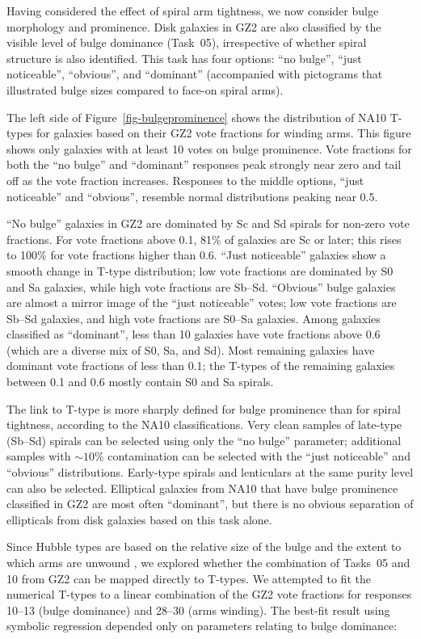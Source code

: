 \documentclass[useAMS,usenatbib]{mn2e}
\begin{document}
Having considered the effect of spiral arm tightness, we now consider bulge morphology and prominence. Disk galaxies in GZ2 are also classified by the visible level of bulge dominance (Task~05), irrespective of whether spiral structure is also identified. This task has four options: ``no bulge'', ``just noticeable'', ``obvious'', and ``dominant'' (accompanied with pictograms that illustrated bulge sizes compared to face-on spiral arms). 

The left side of Figure~\ref{fig-bulgeprominence} shows the distribution of NA10 T-types for galaxies based on their GZ2 vote fractions for winding arms. This figure shows only galaxies with at least 10 votes on bulge prominence. Vote fractions for both the ``no bulge'' and ``dominant'' responses peak strongly near zero and tail off as the vote fraction increases. Responses to the middle options, ``just noticeable'' and ``obvious'', resemble normal distributions peaking near 0.5. 

``No bulge'' galaxies in GZ2 are dominated by Sc and Sd spirals for non-zero vote fractions. For vote fractions above 0.1, 81\% of galaxies are Sc or later; this rises to 100\% for vote fractions higher than 0.6. ``Just noticeable'' galaxies show a smooth change in T-type distribution; low vote fractions are dominated by S0 and Sa galaxies, while high vote fractions are Sb--Sd. ``Obvious'' bulge galaxies are almost a mirror image of the ``just noticeable'' votes; low vote fractions are Sb--Sd galaxies, and high vote fractions are S0--Sa galaxies. Among galaxies classified as ``dominant'', less than 10 galaxies have vote fractions above 0.6 (which are a diverse mix of S0, Sa, and Sd). Most remaining galaxies have dominant vote fractions of less than 0.1; the T-types of the remaining galaxies between 0.1 and 0.6 mostly contain S0 and Sa spirals. 

The link to T-type is more sharply defined for bulge prominence than for spiral tightness, according to the NA10 classifications. Very clean samples of late-type (Sb--Sd) spirals can be selected using only the ``no bulge'' parameter; additional samples with $\sim10$\% contamination can be selected with the ``just noticeable'' and ``obvious'' distributions. Early-type spirals and lenticulars at the same purity level can also be selected. Elliptical galaxies from NA10 that have bulge prominence classified in GZ2 are most often ``dominant'', but there is no obvious separation of ellipticals from disk galaxies based on this task alone. 

Since Hubble types are based on the relative size of the bulge and the extent to which arms are unwound \citep{hub26}, we explored whether the combination of Tasks~05 and 10 from GZ2 can be mapped directly to T-types. We attempted to fit the numerical T-types to a linear combination of the GZ2 vote fractions for responses 10--13 (bulge dominance) and 28--30 (arms winding). The best-fit result using symbolic regression \citep{sch09c} depended only on parameters relating to bulge dominance:
\end{document}
